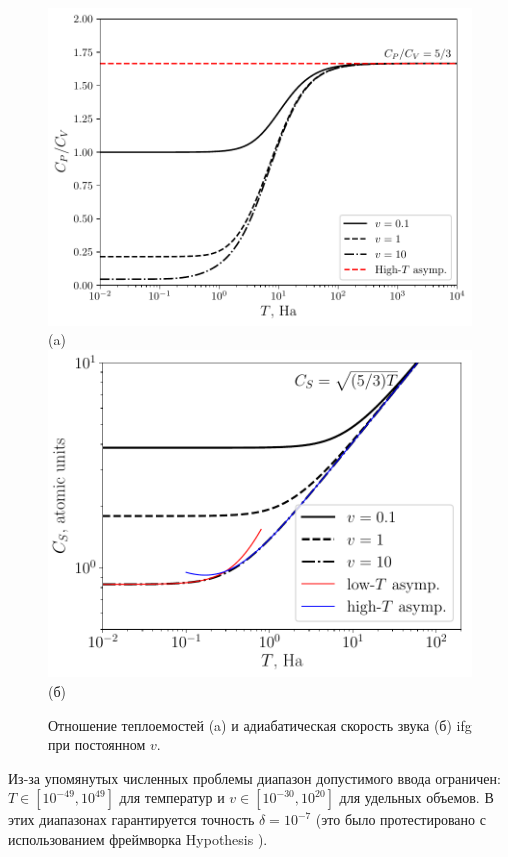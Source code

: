 \begin{figure}[!h]
    \hspace{-1cm}
  \includegraphics[width=0.5\columnwidth]{img/cp_by_cv}(a)
  \includegraphics[width=0.5\columnwidth]{img/cs}(б)
  \caption{
      Отношение теплоемостей (a) и адиабатическая скорость звука (б) \acrshort{ifg} при постоянном $v$. 
  }
  \label{fig:sound_velocity}
\end{figure}

Из-за упомянутых численных проблемы диапазон допустимого ввода ограничен: $T \in [10^{-49}, 10^{49}]$ для температур и $v \in [10^{-30}, 10^{20}]$ для удельных объемов.
В этих диапазонах гарантируется точность $\delta = 10^{-7}$ (это было протестировано с использованием фреймворка Hypothesis \cite{MacIver2019Hypothesis}).



